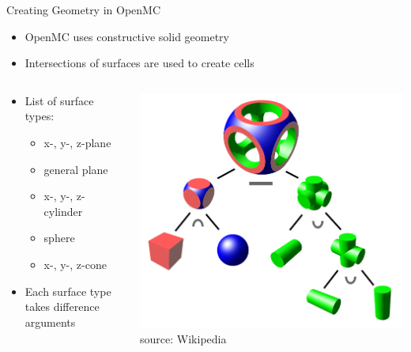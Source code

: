 \documentclass[serif]{beamer}
\begin{document}

\begin{frame}{Creating Geometry in OpenMC}
  \begin{itemize}
    \vfill
    \item<1-> OpenMC uses constructive solid geometry
    \vfill
    \item<1-> Intersections of surfaces are used to create cells
  \end{itemize}
  \vfill
  \begin{columns}[T]
    \begin{column}[T]{0.5\linewidth}
      \begin{itemize}
        \item<1-> List of surface types:
        \begin{itemize}
          \item<1-> x-, y-, z-plane
          \vfill
          \item<1-> general plane
          \vfill
          \item<1-> x-, y-, z-cylinder
          \vfill
          \item<1-> sphere
          \vfill
          \item<1-> x-, y-, z-cone
        \end{itemize}
        \vfill
        \item<1-> Each surface type takes difference arguments
      \end{itemize}
    \end{column}
    \begin{column}[T]{0.5\linewidth}
      \vfill
      \begin{center}
        \includegraphics[scale=0.15]{src/csg-tree.png} \\
        \scriptsize
        source: Wikipedia
      \end{center}
    \end{column}
  \end{columns}
\end{frame}
\end{document}

